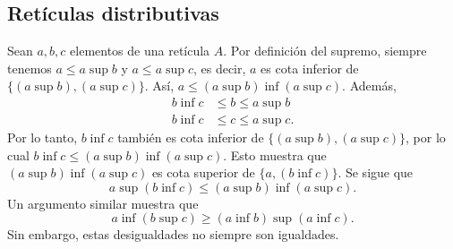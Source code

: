 \subsection{Retículas distributivas}\label{distr}

Sean $a,b,c$ elementos de una retícula $A$.
Por definición del supremo, siempre tenemos
$a\leq a\sup b$ y $a\leq a\sup c$,
es decir, $a$ es cota inferior de $\{(a\sup b),(a\sup c)\}$.
Así, $a\leq (a\sup b)\inf(a\sup c)$.
Además,
\begin{align*}
  b\inf c &\leq b\leq a\sup b \\
  b\inf c &\leq c\leq a\sup c.
\end{align*}
Por lo tanto, $b\inf c$ también es cota inferior de $\{(a\sup
b),(a\sup c)\}$, por lo cual $b\inf c\leq(a\sup b)\inf(a\sup c)$.
Esto muestra que $(a\sup b)\inf(a\sup c)$ es cota superior de
$\{a,(b\inf c)\}$. Se sigue que
\[
  a\sup(b\inf c)
  \leq (a\sup b)\inf(a\sup c)
.\]
Un argumento similar muestra que
\[
  a\inf(b\sup c)
  \geq (a\inf b)\sup(a\inf c)
.\]
Sin embargo, estas desigualdades no siempre son igualdades.

